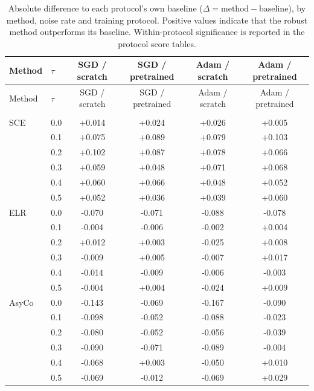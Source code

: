 
\begin{small}
\setlength{\LTcapwidth}{\textwidth}
\begin{longtable}{llcccc}
\caption{Absolute difference to each protocol's own baseline ($\Delta=\text{method}-\text{baseline}$), by method, noise rate and training protocol. Positive values indicate that the robust method outperforms its baseline. Within-protocol significance is reported in the protocol score tables.}\label{tab:app-protocol-delta-full}\\
\toprule
Method & $\tau$ & SGD / scratch & SGD / pretrained & Adam / scratch & Adam / pretrained \\
\midrule
\endfirsthead
\toprule
Method & $\tau$ & SGD / scratch & SGD / pretrained & Adam / scratch & Adam / pretrained \\
\midrule
\endhead
\addlinespace
\multicolumn{6}{l}{\textit{Balanced accuracy}} \\
SCE & 0.0 & +0.014 & +0.024 & +0.026 & +0.005 \\
 & 0.1 & +0.075 & +0.089 & +0.079 & +0.103 \\
 & 0.2 & +0.102 & +0.087 & +0.078 & +0.066 \\
 & 0.3 & +0.059 & +0.048 & +0.071 & +0.068 \\
 & 0.4 & +0.060 & +0.066 & +0.048 & +0.052 \\
 & 0.5 & +0.052 & +0.036 & +0.039 & +0.060 \\
\addlinespace
ELR & 0.0 & -0.070 & -0.071 & -0.088 & -0.078 \\
 & 0.1 & -0.004 & -0.006 & -0.002 & +0.004 \\
 & 0.2 & +0.012 & +0.003 & -0.025 & +0.008 \\
 & 0.3 & -0.009 & +0.005 & -0.007 & +0.017 \\
 & 0.4 & -0.014 & -0.009 & -0.006 & -0.003 \\
 & 0.5 & -0.004 & +0.004 & -0.024 & +0.009 \\
\addlinespace
AsyCo & 0.0 & -0.143 & -0.069 & -0.167 & -0.090 \\
 & 0.1 & -0.098 & -0.052 & -0.088 & -0.023 \\
 & 0.2 & -0.080 & -0.052 & -0.056 & -0.039 \\
 & 0.3 & -0.090 & -0.071 & -0.089 & -0.004 \\
 & 0.4 & -0.068 & +0.003 & -0.050 & +0.010 \\
 & 0.5 & -0.069 & -0.012 & -0.069 & +0.029 \\

\end{longtable}
\end{small}
